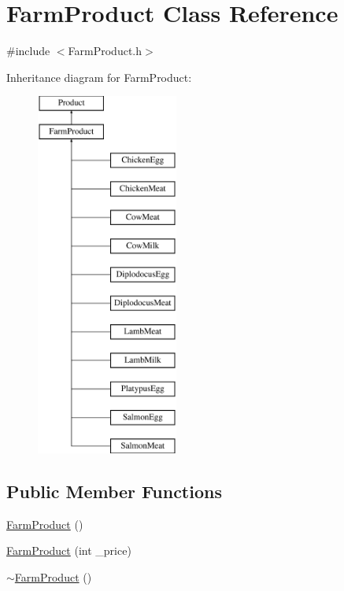 \hypertarget{classFarmProduct}{}\section{Farm\+Product Class Reference}
\label{classFarmProduct}


{\ttfamily \#include $<$Farm\+Product.\+h$>$}

Inheritance diagram for Farm\+Product\+:\begin{figure}[H]
\begin{center}
\leavevmode
\includegraphics[height=12.000000cm]{classFarmProduct}
\end{center}
\end{figure}
\subsection*{Public Member Functions}
\begin{DoxyCompactItemize}
\item 
\mbox{\hyperlink{classFarmProduct_a2eefa1f8ab8f2437b97e18026ecdc8a4}{Farm\+Product}} ()
\item 
\mbox{\hyperlink{classFarmProduct_aa476fed2ddced2d6f872a17f887c24e5}{Farm\+Product}} (int \+\_\+price)
\item 
\mbox{\hyperlink{classFarmProduct_aabc3f4da34b474619e38e5c602490d2d}{$\sim$\+Farm\+Product}} ()
\end{DoxyCompactItemize}
